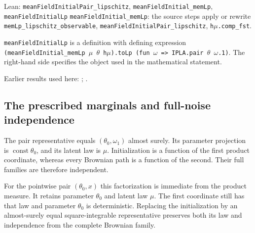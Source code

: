 \documentclass[11pt,a4paper]{report}
\begin{document}
\begin{leanbox}{Lean: \texttt{meanFieldInitialPair\_\allowbreak{}lipschitz}, \texttt{meanFieldInitial\_\allowbreak{}memLp}, \texttt{meanFieldInitialLp}}
\texttt{mean\allowbreak{}Field\allowbreak{}Initial\_\allowbreak{}mem\allowbreak{}Lp}: the source steps apply or rewrite \texttt{mem\allowbreak{}Lp\_\allowbreak{}lipschitz\_\allowbreak{}observable}, \texttt{mean\allowbreak{}Field\allowbreak{}Initial\allowbreak{}Pair\_\allowbreak{}lipschitz}, \texttt{h\ensuremath{\mu}.\allowbreak{}comp\_\allowbreak{}fst}.



\texttt{mean\allowbreak{}Field\allowbreak{}Initial\allowbreak{}Lp} is a definition with defining expression \texttt{(mean\allowbreak{}Field\allowbreak{}Initial\_\allowbreak{}mem\allowbreak{}Lp \ensuremath{\mu} \ensuremath{\theta} h\ensuremath{\mu}).\allowbreak{}to\allowbreak{}Lp (fun \ensuremath{\omega} => IPLA.\allowbreak{}pair \ensuremath{\theta} \ensuremath{\omega}.\allowbreak{}1)}. The right-hand side specifies the object used in the mathematical statement.
\end{leanbox}


Earlier results used here: \cite[Section~3.1.1]{LangevinLean2026IPLA}; \cite[Section~3.3.1]{LangevinLean2026IPLA}.
\subsection{\texorpdfstring{The prescribed marginals and full-noise independence}{The prescribed marginals and full-noise independence}}
\label{report-step-ProximalLangevin-MeanFieldInitialSource-lean-3}


The pair representative equals \((\theta_0,\omega_1)\) almost surely. Its parameter projection is \(\operatorname{const}\theta_0\), and its latent law is \(\mu\). Initialization is a function of the first product coordinate, whereas every Brownian path is a function of the second. Their full families are therefore independent.



For the pointwise pair \((\theta_0,x)\) this factorization is immediate from the product measure. It retains parameter \(\theta_0\) and latent law \(\mu\). The first coordinate still has that law and parameter \(\theta_0\) is deterministic. Replacing the initialization by an almost-surely equal square-integrable representative preserves both its law and independence from the complete Brownian family.
\end{document}
